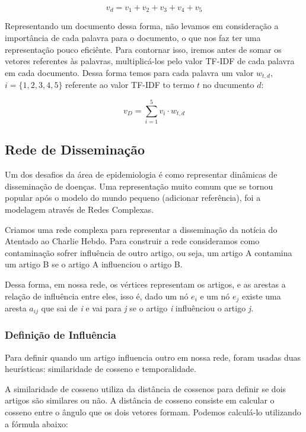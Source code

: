 \documentclass[a4paper,12pt]{article}
\begin{document}
  $$v_{d} = v_{1}+v_{2}+v_{3}+v_{4}+v_{5} $$
  
  Representando um documento dessa forma, não levamos em consideração a importância de cada palavra para o documento, o que nos faz ter
  uma representação pouco eficiênte. Para contornar isso, iremos antes de somar os vetores referentes às palavras, multiplicá-los 
  pelo valor TF-IDF de cada palavra em cada documento. Dessa forma temos para cada palavra um valor $w_{t,d}$, $i=\{1,2,3,4,5\}$ referente
  ao valor TF-IDF to termo $t$ no ducumento $d$:
  
  $$v_{D} = \sum_{i=1}^{5} v_{i} \cdot w_{t,d} $$


\subsection{Rede de Disseminação}
 
 Um dos desafios da área de epidemiologia é como representar dinâmicas de disseminação de doenças. Uma representação muito comum que se tornou popular após o modelo
 do mundo pequeno (adicionar referência), foi a modelagem através de Redes Complexas.
 
 Criamos uma rede complexa para representar a disseminação da notícia do Atentado ao Charlie Hebdo. Para construir a rede
 consideramos como contaminação sofrer influência de outro artigo, ou seja, um artigo A contamina um artigo B se o artigo A influenciou o
 artigo B.
 
 Dessa forma, em nossa rede, os vértices representam os artigos, e as arestas a relação de influência entre eles, isso é, dado um nó $e_{i}$ e um nó
 $e_{j}$ existe uma aresta $a_{ij}$ que sai de \textit{i} e vai para \textit{j} se o artigo \textit{i} influênciou o artigo \textit{j}.
 
 
 
\subsubsection{Definição de Influência}
 
 Para definir quando um artigo influencia outro em nossa rede, foram usadas duas heurísticas: similaridade de cosseno e temporalidade.
 
 A similaridade de cosseno utiliza da distância de cossenos para definir se dois artigos são similares ou não. A distância de cosseno
 consiste em calcular o cosseno entre o ângulo que os dois vetores formam. Podemos calculá-lo utilizando a fórmula abaixo:
 
\end{document}
